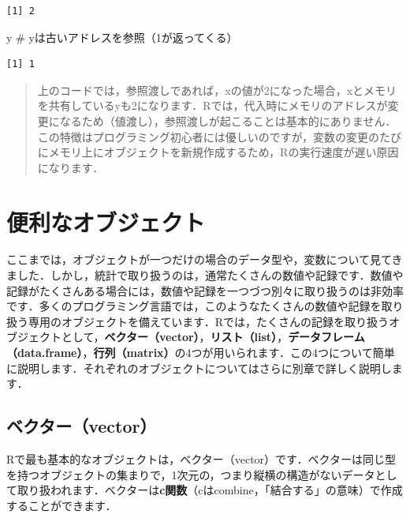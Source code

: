 \documentclass[
  letterpaper,
  DIV=11,
  numbers=noendperiod]{scrreprt}
\newenvironment{Shaded}{\begin{snugshade}}{\end{snugshade}}
\newcommand{\CommentTok}[1]{\textcolor[rgb]{0.37,0.37,0.37}{#1}}
\newcommand{\NormalTok}[1]{\textcolor[rgb]{0.00,0.23,0.31}{#1}}
\begin{document}
\begin{verbatim}
[1] 2
\end{verbatim}

\begin{Shaded}
\begin{Highlighting}[]
\NormalTok{y }\CommentTok{\# yは古いアドレスを参照（1が返ってくる）}
\end{Highlighting}
\end{Shaded}

\begin{verbatim}
[1] 1
\end{verbatim}

\begin{quote}
上のコードでは，参照渡しであれば，xの値が2になった場合，xとメモリを共有しているyも2になります．Rでは，代入時にメモリのアドレスが変更になるため（値渡し），参照渡しが起こることは基本的にありません．この特徴はプログラミング初心者には優しいのですが，変数の変更のたびにメモリ上にオブジェクトを新規作成するため，Rの実行速度が遅い原因になります．
\end{quote}

\hypertarget{ux4fbfux5229ux306aux30aaux30d6ux30b8ux30a7ux30afux30c8}{%
\section{便利なオブジェクト}\label{ux4fbfux5229ux306aux30aaux30d6ux30b8ux30a7ux30afux30c8}}

ここまでは，オブジェクトが一つだけの場合のデータ型や，変数について見てきました．しかし，統計で取り扱うのは，通常たくさんの数値や記録です．数値や記録がたくさんある場合には，数値や記録を一つづつ別々に取り扱うのは非効率です．多くのプログラミング言語では，このようなたくさんの数値や記録を取り扱う専用のオブジェクトを備えています．Rでは，たくさんの記録を取り扱うオブジェクトとして，\textbf{ベクター（vector）}，\textbf{リスト（list）}，\textbf{データフレーム（data.frame）}，\textbf{行列（matrix）}の4つが用いられます．この4つについて簡単に説明します．それぞれのオブジェクトについてはさらに別章で詳しく説明します．

\hypertarget{ux30d9ux30afux30bfux30fcvector}{%
\subsection{ベクター（vector）}\label{ux30d9ux30afux30bfux30fcvector}}

Rで最も基本的なオブジェクトは，ベクター（vector）です．ベクターは同じ型を持つオブジェクトの集まりで，1次元の，つまり縦横の構造がないデータとして取り扱われます．ベクターは\textbf{c関数}（cはcombine，「結合する」の意味）で作成することができます．
\end{document}
